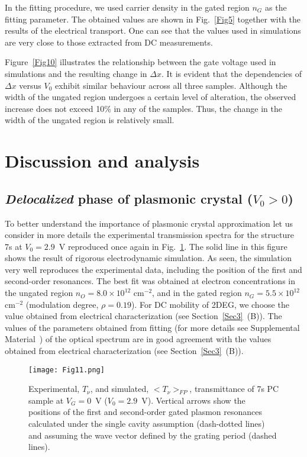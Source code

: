\documentclass[%
 reprint,
 amsmath,amssymb,
 aps,
]{revtex4-2}
\begin{document}
In the fitting procedure, we used carrier density in the gated region $n_G$ as the fitting parameter.
The obtained values are shown in Fig.~\ref{Fig5} together with the results of the electrical transport.
One can see that the values used in simulations are very close to those extracted from DC measurements.

Figure~\ref{Fig10} illustrates the relationship between the gate voltage used in simulations and the resulting change in $\Delta x$. It is evident that the dependencies of $\Delta x$ versus $V_0$ exhibit similar behaviour across all three samples. 
Although the width of the ungated region undergoes a certain level of alteration, the observed increase does not exceed 10\% in any of the samples. 
Thus, the change in the width of the ungated region is relatively small.


\section{Discussion and analysis}\label{Sec5}

\subsection{ \textit{Delocalized} phase of plasmonic crystal ($V_0 > 0$)}

To better understand the importance of plasmonic crystal approximation let us consider in more details the experimental transmission spectra for the structure 7s at $V_0 = 2.9$~V reproduced once again in Fig.~\ref{Fig11}.
The solid line in this figure shows the result of rigorous electrodynamic simulation. As seen, the simulation very well reproduces the experimental data, including the position of the first and second-order resonances. The best fit was obtained at electron concentrations in the ungated region $n_O = 8.0 \times 10^{12}$ cm$^{-2}$, and in the gated region $n_G = 5.5 \times 10^{12}$ cm$^{-2}$ (modulation degree, $\rho = 0.19$). 
For DC mobility of 2DEG, we choose the value obtained from electrical characterization (see Section~\ref{Sec3}~(B)). 
The values of the parameters obtained from fitting (for more details see Supplemental Material~\cite{suppl}) of the optical spectrum are in good agreement with the values obtained from electrical characterization (see Section~\ref{Sec3}~(B)).

\begin{figure}[t!!!]
\texttt{[image: Fig11.png]}
\caption{\label{Fig11} Experimental, $T_{\nu}$, and simulated, $<T_{\nu}>_{FP}$, transmittance of 7s PC sample at $V_G = 0$~V ($V_0 = 2.9$~V). Vertical arrows show the positions of the first and second-order gated plasmon resonances calculated under the single cavity assumption (dash-dotted lines) and assuming the wave vector defined by the grating period (dashed lines).}
\end{figure}
\end{document}
